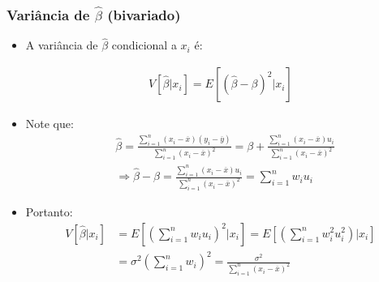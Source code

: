 \documentclass[10pt,slides,xcolor=pdftex,dvipsnames,table]{beamer}
\begin{document}

\begin{frame}[fragile]
	\frametitle{Variância de $\widehat{\beta}$ (bivariado)}

\begin{itemize}\itemsep1.2em

\item A variância de $\widehat{\beta}$ condicional a $x_i$ é:

\begin{align*}
V [\widehat{\beta} | x_i] = E \left[ (\widehat{\beta} - \beta)^2 | x_i \right] 
\end{align*}

\item Note que: 
\begin{align*}
& \widehat{\beta} = \frac{\sum_{i=1}^n (x_i - \overline{x}) (y_i - \overline{y})}{\sum_{i=1}^n (x_i- \overline{x})^2} = \beta + \frac{\sum_{i=1}^n (x_i- \overline{x}) u_i}{\sum_{i=1}^n (x_i- \overline{x})^2} \\
& \Longrightarrow  \widehat{\beta} - \beta = \frac{\sum_{i=1}^n (x_i - \overline{x}) u_i}{\sum_{i=1}^n (x_i- \overline{x})^2} = \sum_{i=1}^n w_i u_i
\end{align*}

\item Portanto: 
\begin{align*}
V [\widehat{\beta} | x_i] &= E \left[ \left( \sum_{i=1}^n w_i u_i \right)^2 | x_i \right] = E \left[ \left( \sum_{i=1}^n w_i^2 u_i^2 \right) | x_i \right] \\
&=  \sigma^2 \left(\sum_{i=1}^n w_i\right)^2 = \frac{\sigma^2}{\sum_{i=1}^n (x_i- \overline{x})^2} 
\end{align*}

\end{itemize}

\end{frame}

\end{document}
